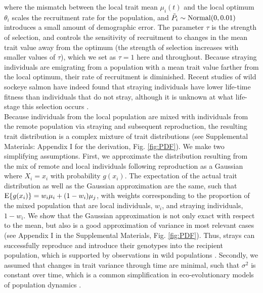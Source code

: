 \documentclass{revtex4}
\begin{document}
\noindent where the mismatch between the local trait mean $\mu_i(t)$ and the local optimum $\theta_i$ scales the recruitment rate for the population, and $\tilde{P}_i\sim {\rm Normal}(0,0.01)$ introduces a small amount of demographic error.
The parameter $\tau$ is the strength of selection, and controls the sensitivity of recruitment to changes in the mean trait value away from the optimum (the strength of selection increases with smaller values of $\tau$), which we set as $\tau=1$ here and throughout.
Because straying individuals are emigrating from a population with a mean trait value farther from the local optimum, their rate of recruitment is diminished.
Recent studies of wild sockeye salmon have indeed found that straying individuals have lower life-time fitness than individuals that do not stray, although it is unknown at what life-stage this selection occurs \citep{Peterson:2014gy}.
\\


Because individuals from the local population are mixed with individuals from the remote population via straying and subsequent reproduction, the resulting trait distribution is a complex mixture of trait distributions (see Supplemental Materials: Appendix I for the derivation, Fig. \ref{fig:PDF}).
We make two simplifying assumptions.
First, we approximate the distribution resulting from the mix of remote and local individuals following reproduction as a Gaussian where $X_i=x_i$ with probability $g(x_i)$.
The expectation of the actual trait distribution as well as the Gaussian approximation are the same, such that ${\rm E}\{g(x_i)\} = w_i\mu_i + (1-w_i)\mu_j$, with weights corresponding to the proportion of the mixed population that are local individuals, $w_i$, and straying individuals, $1-w_i$.
We show that the Gaussian approximation is not only exact with respect to the mean, but also is a good approximation of variance in most relevant cases (see Appendix I in the Supplemental Materials, Fig. \ref{fig:PDF}).
Thus, strays can successfully reproduce and introduce their genotypes into the recipient population, which is supported by observations in wild populations \citep{Jasper:2013cc}.
Secondly, we assumed that changes in trait variance through time are minimal, such that $\sigma^2$ is constant over time, which is a common simplification in eco-evolutionary models of population dynamics \citep{Lande:1976ga,Schreiber:2011wx,Gilbert:2014ee,Gibert:2015kc}.
\end{document}
